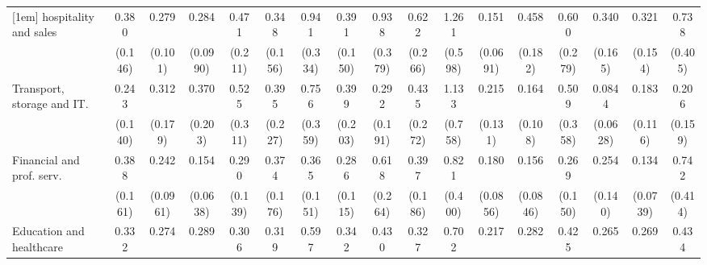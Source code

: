 {\begin{tabular}{l*{16}{c}}
[1em]
hospitality and sales&       0.380\sym{*}  &       0.279\sym{***}&       0.284\sym{***}&       0.471         &       0.348\sym{*}  &       0.941         &       0.391\sym{*}  &       0.938         &       0.622         &       1.261         &       0.151\sym{***}&       0.458\sym{*}  &       0.600         &       0.340\sym{*}  &       0.321\sym{*}  &       0.738         \\
                    &     (0.146)         &     (0.101)         &    (0.0990)         &     (0.211)         &     (0.156)         &     (0.334)         &     (0.150)         &     (0.379)         &     (0.266)         &     (0.598)         &    (0.0691)         &     (0.182)         &     (0.279)         &     (0.165)         &     (0.154)         &     (0.405)         \\
[1em]
Transport, storage and IT.&       0.243\sym{*}  &       0.312\sym{*}  &       0.370         &       0.525         &       0.395         &       0.756         &       0.399         &       0.292         &       0.435         &       1.133         &       0.215\sym{*}  &       0.164\sym{**} &       0.509         &      0.0844\sym{***}&       0.183\sym{**} &       0.206\sym{*}  \\
                    &     (0.140)         &     (0.179)         &     (0.203)         &     (0.311)         &     (0.227)         &     (0.359)         &     (0.203)         &     (0.191)         &     (0.272)         &     (0.758)         &     (0.131)         &     (0.108)         &     (0.358)         &    (0.0628)         &     (0.116)         &     (0.159)         \\
[1em]
Financial and prof. serv.&       0.388\sym{*}  &       0.242\sym{***}&       0.154\sym{***}&       0.290\sym{**} &       0.374\sym{*}  &       0.365\sym{*}  &       0.286\sym{**} &       0.618         &       0.397\sym{*}  &       0.821         &       0.180\sym{***}&       0.156\sym{***}&       0.269\sym{*}  &       0.254\sym{*}  &       0.134\sym{***}&       0.742         \\
                    &     (0.161)         &    (0.0961)         &    (0.0638)         &     (0.139)         &     (0.176)         &     (0.151)         &     (0.115)         &     (0.264)         &     (0.186)         &     (0.400)         &    (0.0856)         &    (0.0846)         &     (0.150)         &     (0.140)         &    (0.0739)         &     (0.414)         \\
[1em]
Education and healthcare&       0.332\sym{**} &       0.274\sym{**} &       0.289\sym{**} &       0.306\sym{**} &       0.319\sym{*}  &       0.597         &       0.342\sym{**} &       0.430         &       0.327\sym{*}  &       0.702         &       0.217\sym{***}&       0.282\sym{**} &       0.425         &       0.265\sym{*}  &       0.269\sym{**} &       0.434         \\

\end{tabular}}
